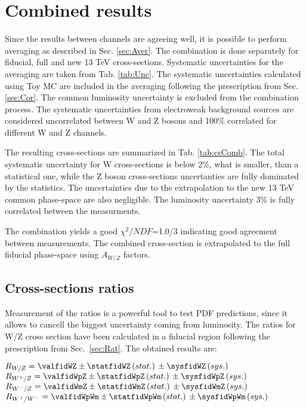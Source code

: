 \section{Combined results}\label{sec:CombCs}

Since the results between channels are agreeing well, it is possible to perform averaging as described in Sec. \ref{sec:Aver}. The combination is done separately for fiducial, full and new 13 TeV cross-sections. Systematic uncertainties for the averaging are taken from Tab. \ref{tab:Unc}. The systematic uncertainties calculated using Toy MC are included in the averaging following the prescription from Sec. \ref{sec:Cor}. The common luminosity uncertainty is excluded from the combination process. The systematic uncertainties from electroweak background sources are considered uncorrelated between W and Z bosons and 100\% correlated for different W and Z channels.

The resulting cross-sections are summarized in Tab. \ref{tab:csComb}. The total systematic uncertainty for W cross-sections is below 2\%, what is smaller, than a statistical one, while the Z boson cross-sections uncertanties are fully dominated by the statistics. The uncertainties due to the extrapolation to the new 13 TeV common phase-space are also negligible. The luminosity uncertainty 3\% is fully correlated between the measurments.


The combination yields a good $\chi^2/NDF$=1.0/3 indicating good agreement between measurements. The combined cross-section is extrapolated to the full fiducial phase-space using $A_{W/Z}$ factors. 


\subsection{Cross-sections ratios}

Measurement of the ratios is a powerful tool to test PDF predictions, since it allows to cancell the biggest uncertainty coming from luminosity. The ratios for W/Z cross section have been calculated in a fiducial region following the prescription from Sec.~\ref{sec:Rat}. The obtained results are:

\begin{center}
$R_{W/Z} = \valfidWZ \pm \statfidWZ \, (stat.)\, \pm \sysfidWZ\, (sys.)\,  $ \\
$R_{W^{+}/Z} = \valfidWpZ \pm \statfidWpZ\, (stat.)\, \pm \sysfidWpZ \, (sys.)\, $ \\
$R_{W^{-}/Z} = \valfidWmZ \pm \statfidWmZ\, (stat.)\,  \pm \sysfidWmZ\,  (sys.)\, $ \\
$R_{W^{+}/W^{-}} = \valfidWpWm \pm \statfidWpWm\, (stat.)\, \pm \sysfidWpWm\,  (sys.)\,  $ \\
\end{center}


